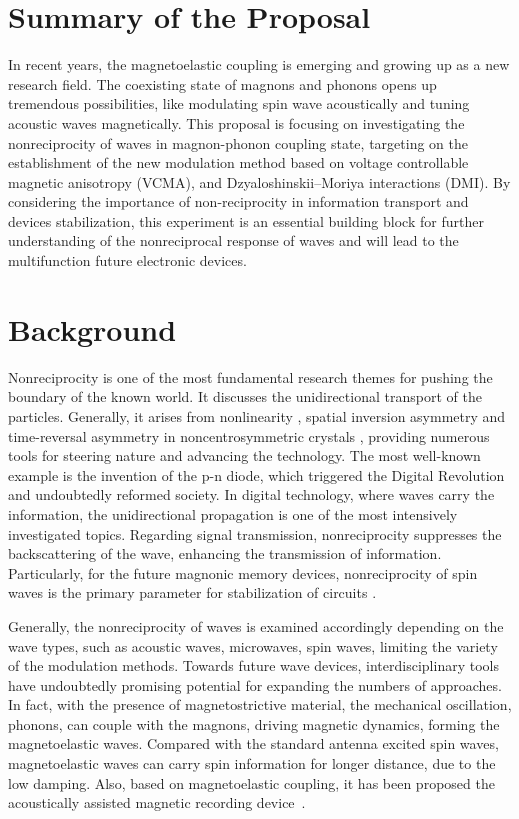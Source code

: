 \section*{Summary of the Proposal}

In recent years, the magnetoelastic coupling is emerging and growing up as a new research field. The coexisting state of magnons and phonons opens up tremendous possibilities, like modulating spin wave acoustically and tuning acoustic waves magnetically. This proposal is focusing on investigating the nonreciprocity of waves in magnon-phonon coupling state, targeting on the establishment of the new modulation method based on voltage controllable magnetic anisotropy (VCMA), and Dzyaloshinskii–Moriya interactions (DMI). By considering the importance of non-reciprocity in information transport and devices stabilization, this experiment is an essential building block for further understanding of the nonreciprocal response of waves and will lead to the multifunction future electronic devices.

\section*{Background}

Nonreciprocity is one of the most fundamental research themes for pushing the boundary of the known world. It discusses the unidirectional transport of the particles. Generally, it arises from nonlinearity \cite{TokuraNagaosaNR2018}, spatial inversion asymmetry and time-reversal asymmetry in noncentrosymmetric crystals \cite{DiNRSW2013,DiNRSW2015}, providing numerous tools for steering nature and advancing the technology. The most well-known example is the invention of the p-n diode, which triggered the Digital Revolution and undoubtedly reformed society. In digital technology, where waves carry the information, the unidirectional propagation is one of the most intensively investigated topics. Regarding signal transmission, nonreciprocity suppresses the backscattering of the wave, enhancing the transmission of information. Particularly, for the future magnonic memory devices, nonreciprocity of spin waves is the primary parameter for stabilization of circuits \cite{DiNRSW2015}.

Generally, the nonreciprocity of waves is examined accordingly depending on the wave types, such as acoustic waves, microwaves, spin waves, limiting the variety of the modulation methods. Towards future wave devices, interdisciplinary tools have undoubtedly promising potential for expanding the numbers of approaches. In fact, with the presence of magnetostrictive material, the mechanical oscillation, phonons, can couple with the magnons, driving magnetic dynamics, forming the magnetoelastic waves. Compared with the standard antenna excited spin waves, magnetoelastic waves can carry spin information for longer distance, due to the low damping. Also, based on magnetoelastic coupling, it has been proposed the acoustically assisted magnetic recording device~\cite{LiMS2014}. 

